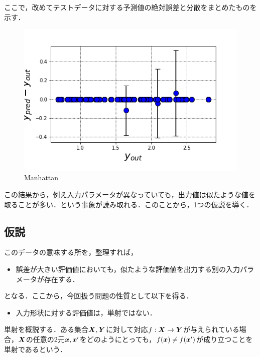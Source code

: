 \documentclass[16.7pt]{jsarticle}
\begin{document}
		ここで，改めてテストデータに対する予測値の絶対誤差と分散をまとめたものを示す．
		
		\begin{figure}[h]
			\centering
				\includegraphics[width= 0.5\columnwidth]{./figure/ERR_WITH_VARS2.png}
			\caption{Manhattan}
		\end{figure}
	
		この結果から，例え入力パラメータが異なっていても，出力値は似たような値を取ることが多い．という事象が読み取れる．このことから，1つの仮説を導く．
		\subsection{仮説}
		このデータの意味する所を，整理すれば，
		\begin{itemize}
			\item 誤差が大きい評価値においても，似たような評価値を出力する別の入力パラメータが存在する．
		\end{itemize}
		となる．ここから，今回扱う問題の性質として以下を得る．
		\begin{itemize}
			\item 入力形状に対する評価値は，単射ではない．
		\end{itemize}
		単射を概説する．ある集合$ \boldsymbol{X},\boldsymbol{Y} $に対して対応$ f:\boldsymbol{X}\rightarrow \boldsymbol{Y} $が与えられている場合，$ \boldsymbol{X} $の任意の2元$ \boldsymbol{x},\boldsymbol{x}' $をどのようにとっても，$ f(\boldsymbol{x}) \neq f(\boldsymbol{x}') $が成り立つことを単射であるという．
		
\end{document}
